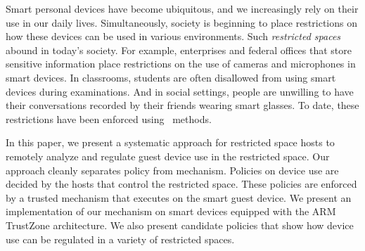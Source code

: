 Smart personal devices have become ubiquitous, and we increasingly rely on
their use in our daily lives. Simultaneously, society is beginning to place
restrictions on how these devices can be used in various environments. Such
\textit{restricted spaces} abound in today's society. For example, enterprises
and federal offices that store sensitive information place restrictions on the
use of cameras and microphones in smart devices. In classrooms, students are
often disallowed from using smart devices during examinations. And in social
settings, people are unwilling to have their conversations recorded by their
friends wearing smart glasses. To date, these restrictions have been enforced
using \adhoc\ methods.

In this paper, we present a systematic approach for restricted space hosts to
remotely analyze and regulate guest device use in the restricted space. Our
approach cleanly separates policy from mechanism.  Policies on device use are
decided by the hosts that control the restricted space. These policies are
enforced by a trusted mechanism that executes on the smart guest device. We
present an implementation of our mechanism on smart devices equipped with the
ARM TrustZone architecture. We also present candidate policies that show how
device use can be regulated in a variety of restricted spaces.
